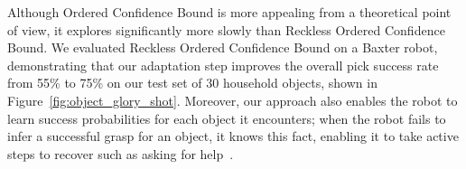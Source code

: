 \documentclass{article}
\newcommand{\algorithmCTxt}{Ordered Confidence Bound\xspace}
\newcommand{\algorithmDTxt}{Reckless Ordered Confidence Bound\xspace}
\begin{document}




Although \algorithmCTxt is more appealing from a theoretical point of view,
it explores significantly more slowly than \algorithmDTxt. 
We evaluated \algorithmDTxt on a Baxter robot, demonstrating that our
adaptation step improves the overall pick success rate from 55\% to
75\% on our test set of 30 household objects, shown in
Figure~\ref{fig:object_glory_shot}.  Moreover, our approach also
enables the robot to learn success probabilities for each object it
encounters; when the robot fails to infer a successful grasp for an
object, it knows this fact, enabling it to take active steps to
recover such as asking for help~\citep{tellex14}.
\end{document}
